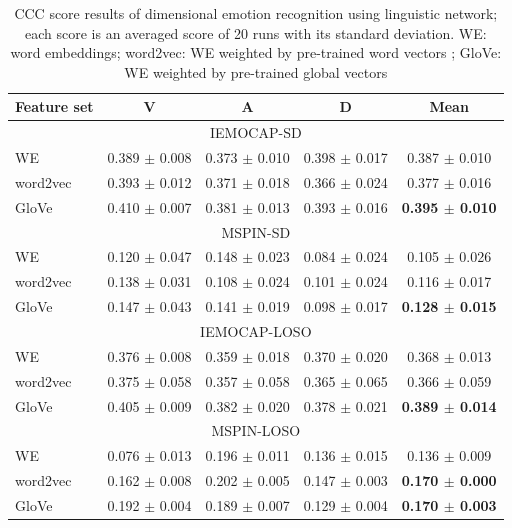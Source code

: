 \begin{table}[htpb]
\caption{CCC score results of dimensional emotion recognition using linguistic
network; each score is an averaged score of 20 runs with its standard
deviation. WE: word embeddings; word2vec: WE weighted by pre-trained word
vectors \cite{Mikolov}; GloVe: WE weighted by pre-trained global vectors
\cite{Pennington2014}}
\begin{center}
 \label{tab:ter-test}
 \begin{tabular}{l c c c c}
 \hline
Feature set & V & A & D & Mean \\
\hline \hline
\multicolumn{5}{c}{IEMOCAP-SD} \\
WE          & 0.389 $\pm$ 0.008 & 0.373 $\pm$ 0.010 & 0.398 $\pm$ 0.017 &
0.387 $\pm$ 0.010 \\
word2vec    & 0.393 $\pm$ 0.012 & 0.371 $\pm$ 0.018 & 0.366 $\pm$ 0.024 &
0.377 $\pm$ 0.016 \\
GloVe       & 0.410 $\pm$ 0.007 & 0.381 $\pm$ 0.013 & 0.393 $\pm$ 0.016 &
\textbf{0.395 $\pm$ 0.010} \\

 \hline
\multicolumn{5}{c}{MSPIN-SD} \\
WE          & 0.120 $\pm$ 0.047 &   0.148 $\pm$ 0.023   & 0.084 $\pm$ 0.024 &
0.105 $\pm$ 0.026 \\
word2vec    & 0.138 $\pm$ 0.031 &   0.108 $\pm$ 0.024   & 0.101 $\pm$ 0.024 &
0.116 $\pm$ 0.017 \\
GloVe       & 0.147 $\pm$ 0.043 &   0.141 $\pm$ 0.019   & 0.098 $\pm$ 0.017 &
\textbf{0.128 $\pm$ 0.015} \\
 \hline
\multicolumn{5}{c}{IEMOCAP-LOSO} \\
WE          & 0.376 $\pm$ 0.008 &   0.359 $\pm$ 0.018 & 0.370 $\pm$ 0.020 &
0.368 $\pm$ 0.013 \\
word2vec    & 0.375 $\pm$ 0.058 &   0.357 $\pm$ 0.058 & 0.365 $\pm$ 0.065 &
0.366 $\pm$ 0.059 \\
GloVe       & 0.405 $\pm$ 0.009 &   0.382 $\pm$ 0.020 & 0.378 $\pm$ 0.021 &
\textbf{0.389 $\pm$ 0.014} \\
 \hline
\multicolumn{5}{c}{MSPIN-LOSO} \\
WE          & 0.076 $\pm$ 0.013 &   0.196 $\pm$ 0.011 & 0.136 $\pm$ 0.015 &
0.136 $\pm$ 0.009 \\
word2vec    & 0.162 $\pm$ 0.008 &   0.202 $\pm$ 0.005 & 0.147 $\pm$ 0.003 &
\textbf{0.170 $\pm$ 0.000} \\
GloVe       & 0.192 $\pm$ 0.004 &   0.189 $\pm$ 0.007 & 0.129 $\pm$ 0.004 &
\textbf{0.170 $\pm$ 0.003} \\
 \hline
 \end{tabular}
\end{center}
\end{table} 

